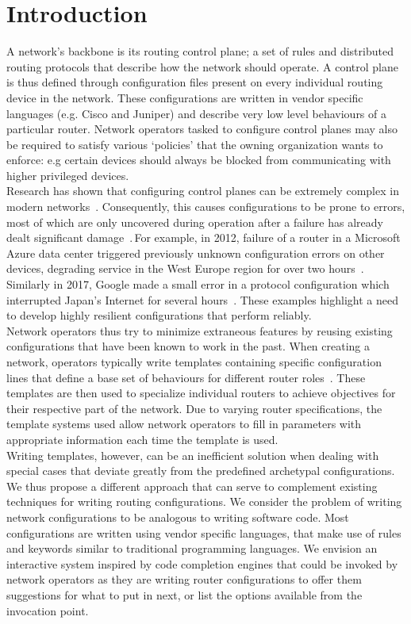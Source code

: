 \section{Introduction}

A network’s backbone is its routing control plane; a set of rules and distributed routing protocols that describe how the network should operate. A control plane is thus defined through configuration files present on every individual routing device in the network. These configurations are written in vendor specific languages (e.g. Cisco and Juniper) and describe very low level behaviours of a particular router. Network operators tasked to configure control planes may also be required to satisfy various ‘policies’ that the owning organization wants to enforce: e.g certain devices should always be blocked from communicating with higher privileged devices.\\

Research has shown that configuring control planes can be extremely complex in modern networks~\cite{complexity}. Consequently, this causes configurations to be prone to errors, most of which are only uncovered during operation after a failure has already dealt significant damage~\cite{errors}. For example, in 2012, failure of a router in a Microsoft Azure data center triggered previously unknown configuration errors on other devices, degrading service in the West Europe region for over two hours~\cite{azure}. Similarly in 2017, Google made a small error in a protocol configuration which interrupted Japan's Internet for several hours~\cite{googlebgp}. These examples highlight a need to develop highly resilient configurations that perform reliably.\\  

Network operators thus try to minimize extraneous features by reusing existing configurations that have been known to work in the past. When creating a network, operators typically write templates containing specific configuration lines that define a base set of behaviours for different router roles~\cite{complexity}. These templates are then used to specialize individual routers to achieve objectives for their respective part of the network. Due to varying router specifications, the template systems used allow network operators to fill in parameters with appropriate information each time the template is used.\\ 


Writing templates, however, can be an inefficient solution when dealing with special cases that deviate greatly from the predefined archetypal configurations. We thus propose a different approach that can serve to complement existing techniques for writing routing configurations. We consider the problem of writing network configurations to be analogous to writing software code. Most configurations are written using vendor specific languages, that make use of rules and keywords similar to traditional programming languages. We envision an interactive system inspired by code completion engines that could be invoked by network operators as they are writing router configurations to offer them suggestions for what to put in next, or list the options available from the invocation point.\\ 


